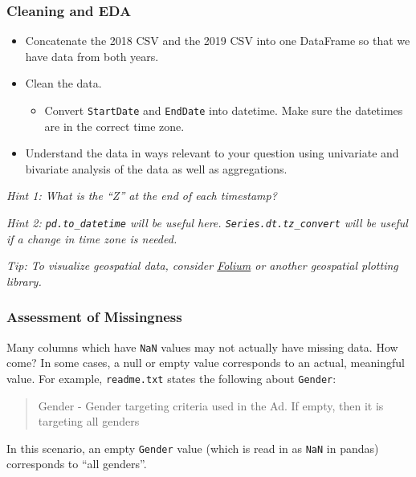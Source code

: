 \documentclass[11pt]{article}
\providecommand{\tightlist}{%
      \setlength{\itemsep}{0pt}\setlength{\parskip}{0pt}}
\begin{document}
\hypertarget{cleaning-and-eda}{%
\subsubsection{Cleaning and EDA}\label{cleaning-and-eda}}

\begin{itemize}
\tightlist
\item
  Concatenate the 2018 CSV and the 2019 CSV into one DataFrame so that
  we have data from both years.
\item
  Clean the data.

  \begin{itemize}
  \tightlist
  \item
    Convert \texttt{StartDate} and \texttt{EndDate} into datetime. Make
    sure the datetimes are in the correct time zone.
  \end{itemize}
\item
  Understand the data in ways relevant to your question using univariate
  and bivariate analysis of the data as well as aggregations.
\end{itemize}

\emph{Hint 1: What is the ``Z'' at the end of each timestamp?}

\emph{Hint 2: \texttt{pd.to\_datetime} will be useful here.
\texttt{Series.dt.tz\_convert} will be useful if a change in time zone
is needed.}

\emph{Tip: To visualize geospatial data, consider
\href{https://python-visualization.github.io/folium/}{Folium} or another
geospatial plotting library.}

\hypertarget{assessment-of-missingness}{%
\subsubsection{Assessment of
Missingness}\label{assessment-of-missingness}}

Many columns which have \texttt{NaN} values may not actually have
missing data. How come? In some cases, a null or empty value corresponds
to an actual, meaningful value. For example, \texttt{readme.txt} states
the following about \texttt{Gender}:

\begin{quote}
Gender - Gender targeting criteria used in the Ad. If empty, then it is
targeting all genders
\end{quote}

In this scenario, an empty \texttt{Gender} value (which is read in as
\texttt{NaN} in pandas) corresponds to ``all genders''.
\end{document}
